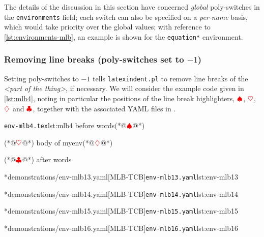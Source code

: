 	\begin{cmhtcbraster}[raster column skip=.1\linewidth]
	\end{cmhtcbraster}

	The details of the discussion in this section have concerned \emph{global}
	poly-switches in the \texttt{environments} field; each switch can also be
	specified on a \emph{per-name} basis, which would take priority over the
	global values; with reference to \vref{lst:environments-mlb}, an example is shown for
	the \texttt{equation*} environment.

\subsubsection{Removing line breaks (poly-switches set to $-1$)}
	Setting poly-switches to $-1$ tells \texttt{latexindent.pl}
	to remove line breaks of the \emph{<part of the thing>}, if necessary. We will consider
	the example code given in \cref{lst:mlb4}, noting in particular the
	positions of the line break highlighters, $\color{red}\spadesuit$,
	$\color{red}\heartsuit$, $\color{red}\diamondsuit$ and $\color{red}\clubsuit$,
	together with the associated YAML files in .

	\begin{minipage}{.45\linewidth}
		\begin{cmhlistings}[style=tcblatex,escapeinside={(*@}{@*)}]{\texttt{env-mlb4.tex}}{lst:mlb4}
before words(*@$\color{red}\spadesuit$@*)
\begin{myenv}(*@$\color{red}\heartsuit$@*)
body of myenv(*@$\color{red}\diamondsuit$@*)
\end{myenv}(*@$\color{red}\clubsuit$@*)
after words
\end{cmhlistings}
	\end{minipage}%
	\hfill
	\begin{minipage}{.51\textwidth}
		\cmhlistingsfromfile[style=yaml-LST]*{demonstrations/env-mlb13.yaml}[MLB-TCB]{\texttt{env-mlb13.yaml}}{lst:env-mlb13}

		\cmhlistingsfromfile[style=yaml-LST]*{demonstrations/env-mlb14.yaml}[MLB-TCB]{\texttt{env-mlb14.yaml}}{lst:env-mlb14}

		\cmhlistingsfromfile[style=yaml-LST]*{demonstrations/env-mlb15.yaml}[MLB-TCB]{\texttt{env-mlb15.yaml}}{lst:env-mlb15}

		\cmhlistingsfromfile[style=yaml-LST]*{demonstrations/env-mlb16.yaml}[MLB-TCB]{\texttt{env-mlb16.yaml}}{lst:env-mlb16}
	\end{minipage}

